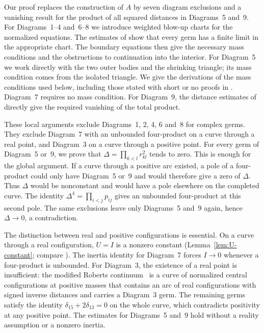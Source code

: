 \documentclass[11pt]{amsart}
\theoremstyle{definition}
\theoremstyle{remark}
\begin{document}
{
Our proof replaces the construction of $A$ by seven diagram exclusions and a vanishing result
for the product of all
squared distances in Diagrams~5 and~9.  For Diagrams~1--4 and~6--8 we introduce weighted blow-up
charts for the normalized equations.  The estimates of \cite[\S3]{AK} show that every germ
has a finite limit in the appropriate chart.  The boundary equations then give the necessary
mass conditions and the obstructions to continuation into the interior.  For Diagram~5 we
work directly with the two outer bodies and the shrinking triangle; its mass condition
comes from the isolated triangle.  We give the derivations of the mass conditions used
below, including those stated with short or no proofs in \cite[\S\S8.3--8.8]{AK}.
Diagram~7 requires no mass condition.  For Diagram~9, the distance estimates of
\cite[\S8.9]{AK} directly give the required vanishing of the total product.

These local arguments exclude Diagrams~1, 2, 4, 6 and~8 for complex germs.  They exclude
Diagram~7 with an unbounded four-product on a curve through a real point, and Diagram~3
on a curve through a positive point.  For every germ of Diagram~5 or~9, we prove that
$\Delta=\prod_{k<l}r_{kl}^2$ tends to zero.  This is enough for the global argument.
If a curve through a positive arc existed, a pole of a four-product could only have
Diagram~5 or~9 and would therefore give a zero of $\Delta$.  Thus $\Delta$ would be nonconstant
and would have a pole elsewhere on the completed curve.  The identity
$\Delta^4=\prod_{i<j}p_{ij}$ gives an unbounded four-product at this second pole.
The same exclusions leave only Diagrams~5 and~9 again, hence $\Delta\to0$, a contradiction.

The distinction between real and positive configurations is essential.  On a curve through a real
configuration, $U=I$ is a nonzero constant (Lemma~\ref{lem:U-constant}; compare \cite[Lemma~2]{AK}).
The inertia identity for Diagram~7 forces $I\to0$ whenever a four-product is unbounded.
For Diagram~3, the existence of a real point is insufficient: the modified Roberts continuum~\cite[p.~543]{AK}
is a curve of normalized central configurations at positive masses that contains an arc of
real configurations with signed inverse distances and carries a Diagram~3 germ.  The remaining
germs satisfy the identity $\delta_{15}+2\delta_{13}=0$ on the whole curve, which contradicts
positivity at any positive point.  The estimates for Diagrams~5 and~9 hold without a reality assumption
or a nonzero inertia.
}
\end{document}
